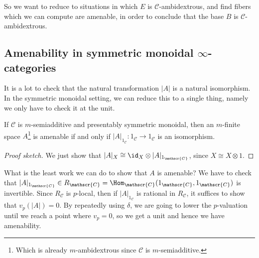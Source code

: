 So we want to reduce to situations in which $E$ is $\mathscr{C}$-ambidextrous, and find fibers which we can compute are amenable, in order to conclude that the base $B$ is $\mathscr{C}$-ambidextrous.

\subsection{Amenability in symmetric monoidal $\infty$-categories}

It is a lot to check that the natural transformation $|A|$ is a natural isomorphism. In the symmetric monoidal setting, we can reduce this to a single thing, namely we only have to check it at the unit.

\begin{lemma} If $\mathscr{C}$ is $m$-semiadditive and presentably symmetric monoidal, then an $m$-finite space $A$\footnote{Which is already $m$-ambidextrous since $\mathscr{C}$ is $m$-semiadditive.} is amenable if and only if $|A|_{1_\mathscr{C}} : 1_{\mathscr{C}} \to 1_{\mathscr{C}}$ is an isomorphism.
\end{lemma}
\begin{proof}[Proof sketch] We just show that $|A|_X \cong \id_X \otimes |A|_{1_\mathscr{C}}$, since $X \cong X \otimes 1$.
\end{proof}

What is the least work we can do to show that $A$ is amenable? We have to check that $|A|_{1_\mathscr{C}} \in R_\mathscr{C} = \Hom_\mathscr{C}(1_\mathscr{C}, 1_\mathscr{C})$ is invertible. Since $R_\mathscr{C}$ is $p$-local, then if $|A|_{1_\mathscr{C}}$ is rational in $R_\mathscr{C}$, it suffices to show that $v_p \left( |A| \right) = 0$. By repeatedly using $\delta$, we are going to lower the $p$-valuation until we reach a point where $v_p = 0$, so we get a unit and hence we have amenability.

